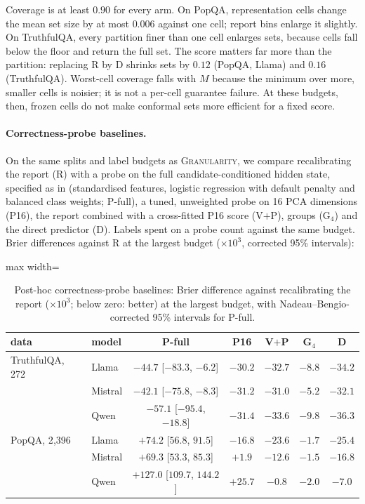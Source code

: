 \documentclass[twoside]{article}
\theoremstyle{definition}
\theoremstyle{remark}
\newcommand{\1}{\mathbf{1}}
\newcommand{\expname}[1]{\textsc{#1}}
\begin{document}
Coverage is at least $0.90$ for every arm. On PopQA, representation cells change the mean set size by at
most $0.006$ against one cell; report bins enlarge it slightly. On TruthfulQA, every partition finer than one
cell enlarges sets, because cells fall below the floor and return the full set. The score matters far more
than the partition: replacing R by D shrinks sets by $0.12$ (PopQA, Llama) and $0.16$ (TruthfulQA). Worst-cell
coverage falls with $M$ because the minimum over more, smaller cells is noisier; it is not a per-cell guarantee
failure. At these budgets, then, frozen cells do not make conformal sets more efficient for a fixed score.

\paragraph{Correctness-probe baselines.} On the same splits and label budgets as \expname{Granularity}, we compare
recalibrating the report (R) with a probe on the full candidate-conditioned hidden state, specified as in
\citet{moreno2025correctness} (standardised features, logistic regression with default penalty and balanced class
weights; P-full), a tuned, unweighted probe on 16 PCA dimensions (P16), the report combined with a cross-fitted P16
score (V$+$P), groups (G$_4$) and the direct predictor (D). Labels spent on a probe count against the same budget.
Brier differences against R at the largest budget ($\times10^3$, corrected 95\% intervals):
\begin{table}[t]
\caption{Post-hoc correctness-probe baselines: Brier difference against recalibrating the report ($\times10^3$; below zero: better) at the largest budget, with Nadeau--Bengio-corrected 95\% intervals for P-full.}
\centering\small
\begin{adjustbox}{max width=\textwidth}
\begin{tabular}{llccccc}
\toprule
data & model & P-full & P16 & V$+$P & G$_4$ & D\\
\midrule
TruthfulQA, 272 & Llama & $-44.7$ [$-83.3$, $-6.2$] & $-30.2$ & $-32.7$ & $-8.8$ & $-34.2$\\
 & Mistral & $-42.1$ [$-75.8$, $-8.3$] & $-31.2$ & $-31.0$ & $-5.2$ & $-32.1$\\
 & Qwen & $-57.1$ [$-95.4$, $-18.8$] & $-31.4$ & $-33.6$ & $-9.8$ & $-36.3$\\
PopQA, 2{,}396 & Llama & $+74.2$ [$56.8$, $91.5$] & $-16.8$ & $-23.6$ & $-1.7$ & $-25.4$\\
 & Mistral & $+69.3$ [$53.3$, $85.3$] & $+1.9$ & $-12.6$ & $-1.5$ & $-16.8$\\
 & Qwen & $+127.0$ [$109.7$, $144.2$] & $+25.7$ & $-0.8$ & $-2.0$ & $-7.0$\\
\bottomrule
\end{tabular}
\end{adjustbox}
\end{table}
\end{document}
